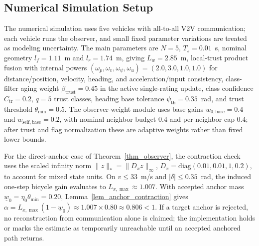 \documentclass[letterpaper,journal]{IEEEtran}
\begin{document}
\subsection{Numerical Simulation Setup}

The numerical simulation uses five vehicles with all-to-all V2V communication; each vehicle runs the observer, and small fixed parameter variations are treated as modeling uncertainty. The main parameters are $N=5$, $T_s=0.01$~s, nominal geometry $l_f=1.11$~m and $l_r=1.74$~m, giving $L_w=2.85$~m, local-trust product fusion with internal powers $(\omega_p,\omega_v,\omega_\psi,\omega_u)=(2.0,3.0,1.0,1.0)$ for distance/position, velocity, heading, and acceleration/input consistency, class-filter aging weight $\beta_{\text{trust}}=0.45$ in the active single-rating update, class confidence $C_{\mathrm{tr}}=0.2$, $q=5$ trust classes, heading base tolerance $\psi_{\mathrm{th}}=0.35$~rad, and trust threshold $\theta_{\min}=0.5$. The observer-weight module uses base gains $w_{0,\mathrm{base}}=0.4$ and $w_{\mathrm{self,base}}=0.2$, with nominal neighbor budget $0.4$ and per-neighbor cap $0.4$; after trust and flag normalization these are adaptive weights rather than fixed lower bounds.

For the direct-anchor case of Theorem~\ref{thm_observer}, the contraction check uses the scaled infinity norm $\|z\|_* = \|D_x z\|_\infty$, $D_x=\mathrm{diag}(0.01,0.01,1,0.2)$, to account for mixed state units. On $v\le33$~m/s and $|\delta|\le0.35$~rad, the induced one-step bicycle gain evaluates to $L_{x,\max}\approx1.007$. With accepted anchor mass $\underline w_0=\eta_0\theta_{\min}=0.20$, Lemma~\ref{lem_anchor_contraction} gives $\alpha=L_{x,\max}(1-\underline w_0)\approx1.007\times0.80\approx0.806<1$. If a target anchor is rejected, no reconstruction from communication alone is claimed; the implementation holds or marks the estimate as temporarily unreachable until an accepted anchored path returns.
\end{document}
